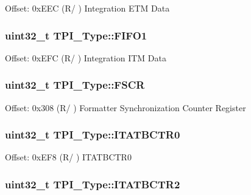Offset\-: 0x\-E\-E\-C (R/ ) Integration E\-T\-M Data \hypertarget{structTPI__Type_aebaa9b8dd27f8017dd4f92ecf32bac8e}{
\subsubsection[{F\-I\-F\-O1}]{ uint32\-\_\-t T\-P\-I\-\_\-\-Type\-::\-F\-I\-F\-O1}}\label{structTPI__Type_aebaa9b8dd27f8017dd4f92ecf32bac8e}
Offset\-: 0x\-E\-F\-C (R/ ) Integration I\-T\-M Data \hypertarget{structTPI__Type_a377b78fe804f327e6f8b3d0f37e7bfef}{
\subsubsection[{F\-S\-C\-R}]{ uint32\-\_\-t T\-P\-I\-\_\-\-Type\-::\-F\-S\-C\-R}}\label{structTPI__Type_a377b78fe804f327e6f8b3d0f37e7bfef}
Offset\-: 0x308 (R/ ) Formatter Synchronization Counter Register \hypertarget{structTPI__Type_a20ca7fad4d4009c242f20a7b4a44b7d0}{
\subsubsection[{I\-T\-A\-T\-B\-C\-T\-R0}]{ uint32\-\_\-t T\-P\-I\-\_\-\-Type\-::\-I\-T\-A\-T\-B\-C\-T\-R0}}\label{structTPI__Type_a20ca7fad4d4009c242f20a7b4a44b7d0}
Offset\-: 0x\-E\-F8 (R/ ) I\-T\-A\-T\-B\-C\-T\-R0 \hypertarget{structTPI__Type_a176d991adb4c022bd5b982a9f8fa6a1d}{
\subsubsection[{I\-T\-A\-T\-B\-C\-T\-R2}]{ uint32\-\_\-t T\-P\-I\-\_\-\-Type\-::\-I\-T\-A\-T\-B\-C\-T\-R2}}\label{structTPI__Type_a176d991adb4c022bd5b982a9f8fa6a1d}
